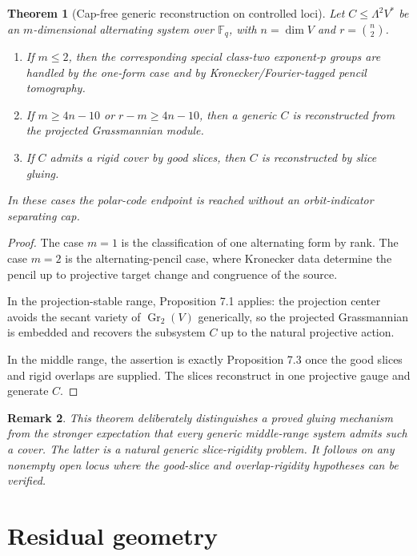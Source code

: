 \documentclass[11pt]{article}
\newtheorem{theorem}{Theorem}[section]
\newtheorem{remark}[theorem]{Remark}
\begin{document}
\begin{theorem}[Cap-free generic reconstruction on controlled loci]
Let $C\le\Lambda^2V^*$ be an $m$-dimensional alternating system over $\mathbb F_q$, with $n=\dim V$ and $r=\binom n2$.
\begin{enumerate}[label=\roman*.]
\item If $m\le2$, then the corresponding special class-two exponent-$p$ groups are handled by the one-form case and by Kronecker/Fourier-tagged pencil tomography.
\item If $m\ge4n-10$ or $r-m\ge4n-10$, then a generic $C$ is reconstructed from the projected Grassmannian module.
\item If $C$ admits a rigid cover by good slices, then $C$ is reconstructed by slice gluing.
\end{enumerate}
In these cases the polar-code endpoint is reached without an orbit-indicator separating cap.
\end{theorem}

\begin{proof}
The case $m=1$ is the classification of one alternating form by rank. The case $m=2$ is the alternating-pencil case, where Kronecker data determine the pencil up to projective target change and congruence of the source.

In the projection-stable range, Proposition 7.1 applies: the projection center avoids the secant variety of $\operatorname{Gr}_2(V)$ generically, so the projected Grassmannian is embedded and recovers the subsystem $C$ up to the natural projective action.

In the middle range, the assertion is exactly Proposition 7.3 once the good slices and rigid overlaps are supplied. The slices reconstruct in one projective gauge and generate $C$.
\end{proof}

\begin{remark}
This theorem deliberately distinguishes a proved gluing mechanism from the stronger expectation that every generic middle-range system admits such a cover. The latter is a natural generic slice-rigidity problem. It follows on any nonempty open locus where the good-slice and overlap-rigidity hypotheses can be verified.
\end{remark}

\section{Residual geometry}
\end{document}
